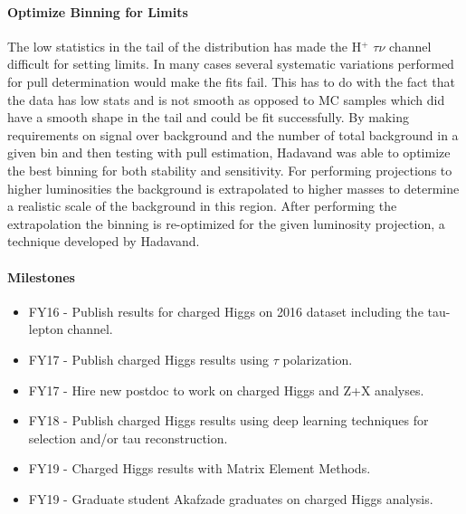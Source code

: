 
\paragraph{Optimize Binning for Limits} %
The low statistics in the tail of the distribution has made the H$^+$ \too $\tau \nu$ channel difficult for setting limits.  In many cases several systematic variations performed for pull determination would make the fits fail.  
This has to do with the fact that the data has low stats and is not smooth as opposed to MC samples which did have a smooth shape in the tail and could be fit successfully.
By making requirements on signal over background and the number of total background in a given
bin and then testing with pull estimation, Hadavand was able to optimize the best binning for both stability and sensitivity.  For performing projections to higher luminosities the background is extrapolated to higher masses
to determine a realistic scale of the background in this region. After performing the extrapolation the binning is re-optimized for the given luminosity projection, a technique developed by Hadavand.
\paragraph{Milestones}
\begin{itemize}[noitemsep,nolistsep]
\item{FY16 - Publish results for charged Higgs on 2016 dataset including the tau-lepton channel.}
\item{FY17 - Publish charged Higgs results using $\tau$ polarization.}
\item{FY17 - Hire new postdoc to work on charged Higgs and Z+X analyses.}
\item{FY18 - Publish charged Higgs results using deep learning techniques for selection and/or tau reconstruction.}
\item{FY19 - Charged Higgs results with Matrix Element Methods.}
\item{FY19 - Graduate student Akafzade graduates on charged Higgs analysis.}
\end{itemize}

